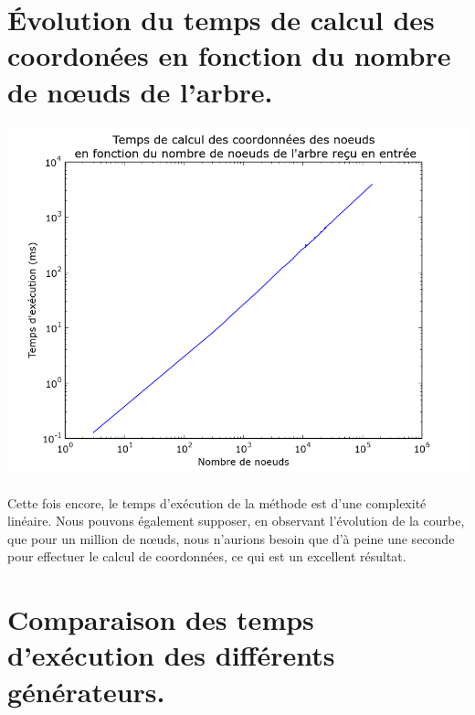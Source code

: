 	\section{Évolution du temps de calcul des coordonées en fonction du nombre de n\oe uds de l'arbre.}
	
\begin{center}

\includegraphics[width=\columnwidth]{execTimeCoord}

\end{center}

\paragraph{} Cette fois encore, le temps d'exécution de la méthode est d'une complexité linéaire. Nous pouvons également supposer, en observant l'évolution de la courbe, que pour un million de n\oe uds, nous n'aurions besoin que d'à peine une seconde pour effectuer le calcul de coordonnées, ce qui est un excellent résultat.

	\section{Comparaison des temps d'exécution des différents générateurs.}

